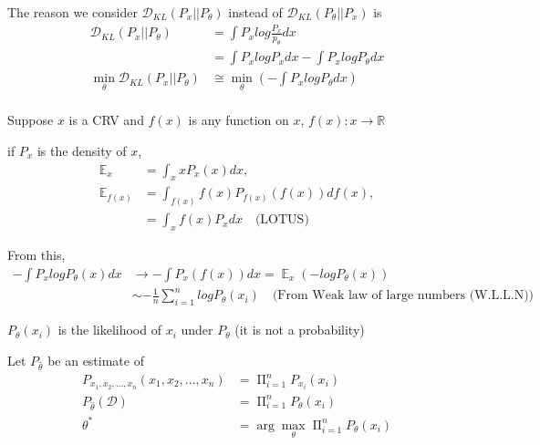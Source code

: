 \documentclass[11pt]{article}
\begin{document}
The reason we consider $\mathcal{D}_{KL}(P_x || P_{\theta})$ instead of $\mathcal{D}_{KL}(P_{\theta} || P_x)$ is
\begin{align*}
  \mathcal{D}_{KL} \left( P_x || P_{\theta} \right) &= \int P_x log \frac{P_x}{p_{\theta}} dx \\
                                                    &= \int P_x log P_x dx - \int P_x log P_{\theta} dx \\
  \min_{\theta} \mathcal{D}_{KL}(P_x || P_{\theta}) &\cong \min_{\theta} \left( - \int P_x log P_{\theta} dx \right) \\
\end{align*}

Suppose $x$ is a CRV and $f(x)$ is any function on $x$, $f(x) : x \rightarrow \mathbb{R}$

if $P_x$ is the density of $x$,
\begin{align*}
  \mathop{\mathbb{E}}_x &= \int_x x P_x(x) dx, \\
  \mathop{\mathbb{E}}_{f(x)} &= \int_{f(x)} f(x) P_{f(x)}\left( f(x) \right) df(x), \\
                        &= \int_x f(x) P_x dx \quad\text{(LOTUS)}
\end{align*}

From this,
\begin{align*}
  -\int P_x log P_{\theta} (x) dx &\rightarrow -\int P_x (f(x)) dx
                                    = \mathop{\mathbb{E}}_x \left( -log P_{\theta}(x) \right) \\
                                  &\sim - \frac{1}{n} \sum_{i=1}^n log P_{\theta}\left( x_i \right) \quad\text{(From Weak law of large numbers (W.L.L.N))}
\end{align*}
\vspace{1em}

$P_{\theta}(x_i)$ is the likelihood of $x_i$ under $P_{\theta}$ (it is not a probability)
\vspace{1em}

Let \(P_{\hat{\theta}}\) be an estimate of
\begin{align*}
  P_{x_1, x_2, ..., x_n}(x_1, x_2, ..., x_n) &= \mathop{\Pi}_{i=1}^n P_{x_i}(x_i) \\
  P_{\hat{\theta}} (\mathcal{D}) &= \mathop{\Pi}_{i=1}^n P_{\theta}(x_i) \\
  \theta^{*} &= \arg\max_{\theta} \mathop{\Pi}_{i=1}^n P_{\theta}(x_i)
\end{align*}
\vspace{1em}
\end{document}
